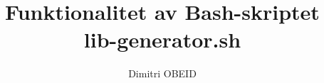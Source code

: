 \documentclass[a4paper,10pt]{article}
\title{\color{red}Funktionalitet av Bash-skriptet \\ \textbf{\color{sec2}lib-generator.sh}}\color{text}
\author{Dimitri OBEID}
\begin{document}
    \maketitle
    \newpage

    \hypertarget{contents}{}
    \tableofcontents
    \newpage

    \color{sec1}
    \section{}\color{text}




\end{document}
